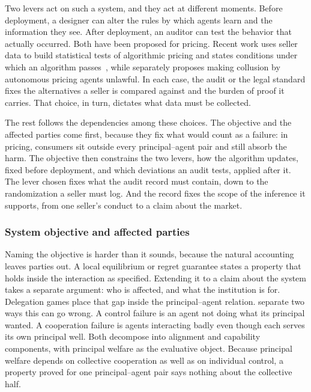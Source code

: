 Two levers act on such a system, and they act at different moments. Before
deployment, a designer can alter the rules by which agents learn and the information
they see. After deployment, an auditor can test the behavior that actually occurred.
Both have been proposed for pricing. Recent work uses seller data to build
statistical tests of algorithmic pricing and states conditions under which an
algorithm passes~\citep{HartlineLongZhang2024,HartlineWangZhang2025}, while
\citet{Harrington2018} separately proposes making collusion by autonomous pricing
agents unlawful. In each case, the audit or the legal standard fixes the
alternatives a seller is compared against and the burden of proof it carries. That
choice, in turn, dictates what data must be collected.

The rest follows the dependencies among these choices. The objective and the affected
parties come first, because they fix what would count as a failure: in pricing,
consumers sit outside every principal--agent pair and still absorb the harm. The
objective then constrains the two levers, how the algorithm updates, fixed before
deployment, and which deviations an audit tests, applied after it. The lever chosen
fixes what the audit record must contain, down to the randomization a seller must
log. And the record fixes the scope of the inference it supports, from one seller's
conduct to a claim about the market.

\subsubsection{System objective and affected parties}
Naming the objective is harder than it sounds, because the natural accounting leaves
parties out. A local equilibrium or regret guarantee states a property that holds
inside the interaction as specified. Extending it to a claim about the system takes a
separate argument: who is affected, and what the institution is for. Delegation
games place that gap inside the principal--agent relation. \citet{Sourbut2024} separate two ways this can go wrong. A control failure is an
agent not doing what its principal wanted. A cooperation failure is agents interacting
badly even though each serves its own principal well. Both decompose into alignment and
capability components, with principal welfare as the evaluative object. Because principal welfare depends on collective
cooperation as well as on individual control, a property proved for one
principal--agent pair says nothing about the collective half.

